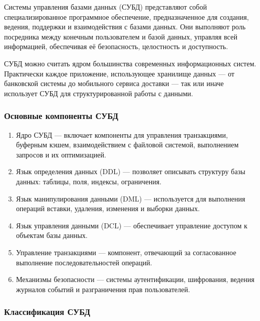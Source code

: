 Системы управления базами данных (СУБД) представляют собой специализированное программное обеспечение, предназначенное для создания, ведения, поддержки и взаимодействия с базами данных. Они выполняют роль посредника между конечным пользователем и базой данных, управляя всей информацией, обеспечивая её безопасность, целостность и доступность.

СУБД можно считать ядром большинства современных информационных систем. Практически каждое приложение, использующее хранилище данных — от банковской системы до мобильного сервиса доставки — так или иначе использует СУБД для структурированной работы с данными.

\subsubsection{Основные компоненты СУБД}

\begin{enumerate}
	\item Ядро СУБД — включает компоненты для управления транзакциями, буферным кэшем, взаимодействием с файловой системой, выполнением запросов и их оптимизацией.
	\item Язык определения данных (DDL) — позволяет описывать структуру базы данных: таблицы, поля, индексы, ограничения.
	\item Язык манипулирования данными (DML) — используется для выполнения операций вставки, удаления, изменения и выборки данных.
	\item Язык управления данными (DCL) — обеспечивает управление доступом к объектам базы данных.
	\item Управление транзакциями — компонент, отвечающий за согласованное выполнение последовательностей операций.
	\item Механизмы безопасности — системы аутентификации, шифрования, ведения журналов событий и разграничения прав пользователей.
\end{enumerate}

\subsubsection{Классификация СУБД}

